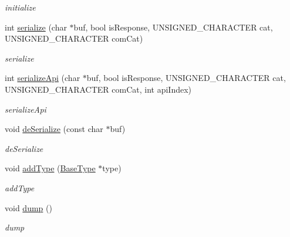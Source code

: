 \begin{DoxyCompactItemize}
\begin{DoxyCompactList}\small\item\em initialize \end{DoxyCompactList}\item 
int \hyperlink{class_a_p_i2_1_1_abstract_user_params_a829abfdd354b76e193853b097f5f7a41}{serialize} (char $\ast$buf, bool is\-Response, U\-N\-S\-I\-G\-N\-E\-D\-\_\-\-C\-H\-A\-R\-A\-C\-T\-E\-R cat, U\-N\-S\-I\-G\-N\-E\-D\-\_\-\-C\-H\-A\-R\-A\-C\-T\-E\-R com\-Cat)
\begin{DoxyCompactList}\small\item\em serialize \end{DoxyCompactList}\item 
int \hyperlink{class_a_p_i2_1_1_abstract_user_params_a2a1668d7d7eb7b62f200dc7c96b7cda3}{serialize\-Api} (char $\ast$buf, bool is\-Response, U\-N\-S\-I\-G\-N\-E\-D\-\_\-\-C\-H\-A\-R\-A\-C\-T\-E\-R cat, U\-N\-S\-I\-G\-N\-E\-D\-\_\-\-C\-H\-A\-R\-A\-C\-T\-E\-R com\-Cat, int api\-Index)
\begin{DoxyCompactList}\small\item\em serialize\-Api \end{DoxyCompactList}\item 
void \hyperlink{class_a_p_i2_1_1_abstract_user_params_acaf6b18d9b234bd559615f081790c9c6}{de\-Serialize} (const char $\ast$buf)
\begin{DoxyCompactList}\small\item\em de\-Serialize \end{DoxyCompactList}\item 
void \hyperlink{class_a_p_i2_1_1_abstract_user_params_a80073e671a7985be49b890ad16501d88}{add\-Type} (\hyperlink{class_a_p_i2_1_1_base_type}{Base\-Type} $\ast$type)
\begin{DoxyCompactList}\small\item\em add\-Type \end{DoxyCompactList}\item 
\hypertarget{class_a_p_i2_1_1_abstract_user_params_a4181644b10e101a4ac69dc0f4b723c1c}{void \hyperlink{class_a_p_i2_1_1_abstract_user_params_a4181644b10e101a4ac69dc0f4b723c1c}{dump} ()}\label{class_a_p_i2_1_1_abstract_user_params_a4181644b10e101a4ac69dc0f4b723c1c}

\begin{DoxyCompactList}\small\item\em dump \end{DoxyCompactList}\end{DoxyCompactItemize}



